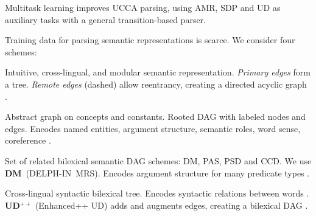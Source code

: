 \documentclass[a0,portrait]{a0poster}
\begin{document}
\vspace{1cm}
\titlespacing*{\section}{0pt}{8mm}{5mm}



\begin{adjustbox}{margin=3mm,frame,minipage=.95\linewidth,center}
\Large\color{Navy}
Multitask learning improves UCCA parsing, using AMR, SDP and UD as auxiliary tasks
with a general transition-based parser.
\end{adjustbox}


\begin{multicols}{2}


\color{Black}

Training data for parsing semantic representations is scarce.
We consider four schemes:
\begin{itemize}[labelsep=1em]
{\color{Indigo} \item[\textbf{UCCA}:] Intuitive, cross-lingual, and modular semantic representation.
    \textit{Primary edges} form a tree. \textit{Remote edges} (dashed) allow reentrancy,
    creating a directed acyclic graph \cite{abend2013universal}.}
{\color{DarkGreen} \item[\textbf{AMR}:] Abstract graph on concepts and constants.
    Rooted DAG with labeled nodes and edges.
    Encodes named entities, argument structure, semantic roles, word sense, coreference \cite{banarescu2013abstract}.}
{\color{DarkRed} \item[\textbf{SDP}:] Set of related bilexical semantic DAG schemes: DM, PAS, PSD and CCD.
    We use \textbf{DM}~(DELPH-IN~MRS).
    Encodes argument structure for many predicate types \cite{oepen2016towards}.}
{\color{DarkBlue} \item[\textbf{UD}:] Cross-lingual syntactic bilexical tree.
    Encodes syntactic relations between words \cite{nivre2016universal}. \\
    \textbf{UD$^{++}$} (Enhanced++ UD) adds and augments edges, creating a bilexical DAG
    \cite{SCHUSTER16.779}.}
\end{itemize}


\end{multicols}
\end{document}
